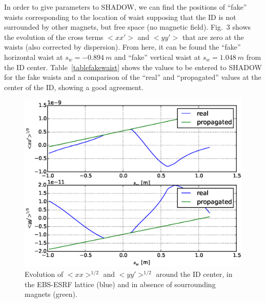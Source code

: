 \documentclass[a4paper,10pt]{article}
\begin{document}
In order to give parameters to SHADOW, we can find the positions of ``fake'' waists corresponding to the location of waist supposing that the ID is
not surrounded by other magnets, but free space (no magnetic field). 
Fig.~3
shows the evolution of the cross 
terms $<xx'>$ and $<yy'>$ that are zero at the waists (also corrected by dispersion). From here, it can be found the ``fake'' horizontal 
waist at $s_w = -0.894~m$ and ``fake'' vertical waist at $s_w = 1.048~m$ from the ID center. Table~\ref{tablefakewaist} shows the values to be entered
to SHADOW for the fake waists and a comparison of the ``real'' and ``propagated'' values at the center of the ID, showing a good agreement. 



\begin{figure}[H]
\label{figfakewaist}
\centering
\includegraphics[keepaspectratio,width=5in]{GRAPHICS/fakewaists.eps}
\caption{Evolution of $<xx>^{1/2}$ and $<yy'>^{1/2}$ around the ID center, in the EBS-ESRF lattice (blue) and in absence of 
sourrounding magnets (green).}
\end{figure}
\end{document}
